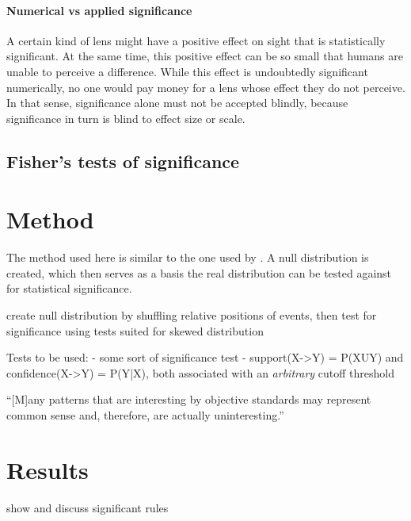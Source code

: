 \paragraph{Numerical vs applied significance} A certain kind of lens might have a positive effect on sight that is statistically significant. At the same time, this positive effect can be so small that humans are unable to perceive a difference. While this effect is undoubtedly significant numerically, no one would pay money for a lens whose effect they do not perceive. In that sense, significance alone must not be accepted blindly, because significance in turn is blind to effect size or scale.

\subsection{Fisher's tests of significance}



\section{Method}
\label{sec:sigmet}
The method used here is similar to the one used by \citet[]{abuzhaya17}. A null distribution is created, which then serves as a basis the real distribution can be tested against for statistical significance.

create null distribution by shuffling relative positions of events, then test for significance using tests suited for skewed distribution

Tests to be used:
- some sort of significance test
- support(X->Y) = P(XUY) and confidence(X->Y) = P(Y|X), both associated with an \emph{arbitrary} cutoff threshold \citep[]{han12}

``[M]any patterns that are interesting by objective standards may represent common sense and, therefore, are actually uninteresting.'' \citep[]{han12}

\section{Results}
\label{sec:sigres}
show and discuss significant rules